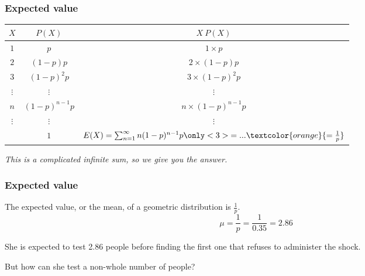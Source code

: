 \documentclass[11pt,containsverbatim,handout]{beamer}
\begin{document}
\begin{frame}
\frametitle{Expected value}


\pause

\begin{center}
\renewcommand{\arraystretch}{1.5}
\begin{tabular}{c | c | c }
$X$   & $P(X)$              & $X ~ P(X)$         \\
\hline
$1$   & $p$                 & $1 \times p$       \\
$2$   & $(1-p)p$            & $2 \times (1-p)p$  \\
$3$   & $(1-p)^2 p$         & $3 \times (1-p)^2 p$ \\
$\vdots$   & $\vdots$       & $\vdots$           \\
$n$   & $(1-p)^{n-1} p$     & $n \times (1-p)^{n-1} p$ \\
$\vdots$   & $\vdots$       & $\vdots$           \\
\hline
      & $1$                 & $E(X) = \sum_{n=1}^{\infty} n (1-p)^{n-1} p \only<3>{=... \textcolor{orange}{= \frac{1}{p}}}$ \\
\end{tabular}
\end{center}
\pause

\textit{This is a complicated infinite sum, so we give you the answer.}

\end{frame}



\begin{frame}
\frametitle{Expected value}


The expected value, or the mean, of a geometric distribution is $\frac{1}{p}$.
\[ \mu = \frac{1}{p} = \frac{1}{0.35} = 2.86 \]

\pause

She is expected to test 2.86 people before finding the first one that refuses to administer the shock. 

\pause

But how can she test a non-whole number of people?

\end{frame}
\end{document}
